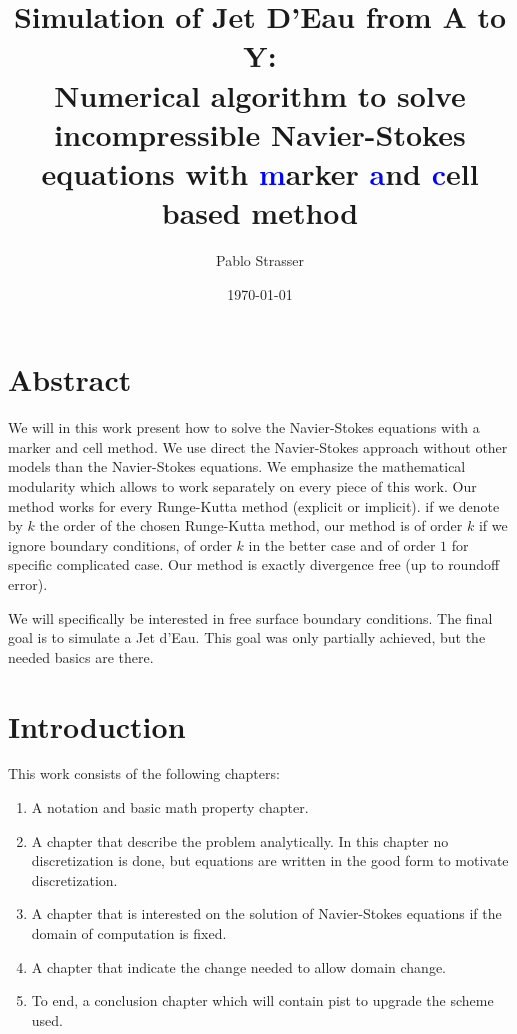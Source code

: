 \documentclass[a4paper]{master}
\title{Simulation of Jet D'Eau from A to Y:\\ Numerical algorithm to solve incompressible Navier-Stokes equations
with \textcolor{blue}{m}arker \textcolor{blue}{a}nd \textcolor{blue}{c}ell based method}
\author{Pablo Strasser}
\date{\today}
\begin{document}
\captionsetup{singlelinecheck=off,margin=10pt,font=small,labelfont=bf}
\maketitle
\dominitoc

\chapter*{Abstract}

\mtcaddchapter[Abstract]

We will in this work present how to solve the Navier-Stokes equations with a marker and cell method.
We use direct the Navier-Stokes approach without other models than the Navier-Stokes equations.
We emphasize the mathematical modularity which allows to work separately on every piece of this work.
Our method works for every Runge-Kutta method (explicit or implicit). if we denote by $k$ the order of the chosen Runge-Kutta method,
our method is of order $k$ if we ignore boundary conditions, of order $k$ in the better case and of order $1$ for specific complicated case.
Our method is exactly divergence free (up to roundoff error).

We will specifically be interested in free surface boundary conditions. The final goal is to simulate a Jet d'Eau.
This goal was only partially achieved, but the needed basics are there. 


\tableofcontents

\chapter*{Introduction}

\mtcaddchapter[Introduction]

This work consists of the following chapters:
\begin{enumerate}
 \item A notation and basic math property chapter.
 \item A chapter that describe the problem analytically. In this chapter no discretization is done, but equations are written in the good form to motivate discretization.
 \item A chapter that is interested on the solution of Navier-Stokes equations if the domain of computation is fixed.
 \item A chapter that indicate the change needed to allow domain change.
 \item To end, a conclusion chapter which will contain pist to upgrade the scheme used.
\end{enumerate}
\end{document}
